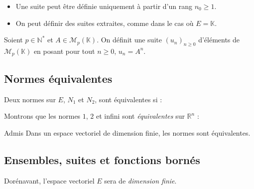 \documentclass[a4paper,10pt]{report}
\begin{document}
\begin{Remarques}{}
\begin{itemize} 
\item Une suite peut être définie uniquement à partir d'un rang $n_0 \geq 1$.
\item On peut définir des suites extraites, comme dans le cas où $E = \mathbb{K}$.
\end{itemize}
\end{Remarques}{}

\medskip

\begin{Exemple} Soient $p \in \mathbb{N}^{*}$ et $A \in \mathcal{M}_p(\mathbb{K})$. On définit une suite $(u_n)_{n \geq 0}$ d'éléments de $\mathcal{M}_p(\mathbb{K})$ en posant pour tout $n \geq 0$, $u_n = A^n$. 
\end{Exemple}

\subsection{Normes équivalentes}

\begin{Definition}{} Deux normes sur $E$, $N_1$ et $N_2$, sont équivalentes si :

\vspace{1cm}
\end{Definition}

\begin{Exemple} Montrons que les normes $1$, $2$ et infini sont \emph{équivalentes} sur $\mathbb{R}^n$ :

\vspace{7cm}
\end{Exemple}

\begin{Theoreme}{Admis} Dans un espace vectoriel de dimension finie, les normes sont équivalentes.
\end{Theoreme}

\subsection{Ensembles, suites et fonctions bornés}

Dorénavant, l'espace vectoriel $E$ sera de \emph{dimension finie}.
\end{document}
